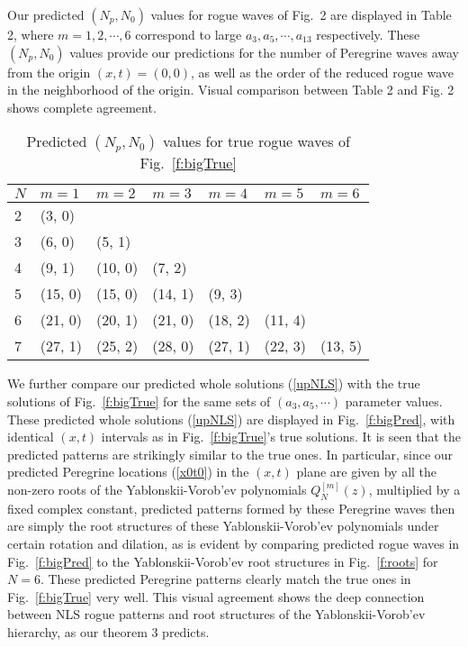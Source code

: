 \documentclass[amsmath,amssymb]{revtex4}
\begin{document}
Our predicted $(N_p, N_0)$ values for rogue waves of Fig.~2 are displayed in Table 2, where $m=1, 2, \cdots, 6$ correspond to large $a_3, a_5, \cdots, a_{13}$ respectively. These $(N_p, N_0)$ values provide our predictions for the number of Peregrine waves away from the origin $(x,t)=(0,0)$, as well as the order of the reduced rogue wave in the neighborhood of the origin. Visual comparison between Table 2 and Fig. 2 shows complete agreement.

\begin{table}[h]
\caption{Predicted $(N_p, N_0)$ values for true rogue waves of Fig.~\ref{f:bigTrue}}
\begin{center}
  \begin{tabular}{ | l | l | l|  l | l|  l | l|}  \hline
         $N$ &              $m=1$   & $m=2$  & $m=3$   & $m=4$   & $m=5$   & $m=6$   \\ \hline
          2 &               (3, 0)  &    &    &   &      &     \\ \hline
          3 &               (6, 0)  & (5, 1)  &   &      &          &          \\ \hline
          4 &               (9, 1)  & (10, 0) & (7, 2)   &          &        &     \\ \hline
          5 &               (15, 0) & (15, 0) & (14, 1)  &  (9, 3)  &        & \\ \hline
          6 &               (21, 0) & (20, 1) & (21, 0)  &  (18, 2) &  (11, 4)&     \\ \hline
          7 &               (27, 1) & (25, 2) & (28, 0)  &  (27, 1) &  (22, 3)&  (13, 5)  \\ \hline
  \end{tabular}
\end{center}
\end{table}

We further compare our predicted whole solutions (\ref{upNLS}) with the true solutions of Fig.~\ref{f:bigTrue}
for the same sets of $(a_{3}, a_{5}, \cdots)$ parameter values. These predicted whole solutions (\ref{upNLS}) are displayed in Fig.~\ref{f:bigPred}, with identical $(x,t)$ intervals as in Fig.~\ref{f:bigTrue}'s true solutions. It is seen that the predicted patterns are strikingly similar to the true ones. In particular, since our predicted Peregrine locations (\ref{x0t0}) in the $(x, t)$ plane are given by all the non-zero roots of the Yablonskii-Vorob'ev polynomials $Q_{N}^{[m]}(z)$, multiplied by a fixed complex constant, predicted patterns formed by these Peregrine waves then are simply the root structures of these Yablonskii-Vorob'ev polynomials under certain rotation and dilation, as is evident by comparing predicted rogue waves in Fig.~\ref{f:bigPred} to the Yablonskii-Vorob'ev root structures in Fig.~\ref{f:roots} for $N=6$. These predicted Peregrine patterns clearly match the true ones in Fig.~\ref{f:bigTrue} very well. This visual agreement shows the deep connection between NLS rogue patterns and root structures of the Yablonskii-Vorob'ev hierarchy, as our theorem 3 predicts.
\end{document}
